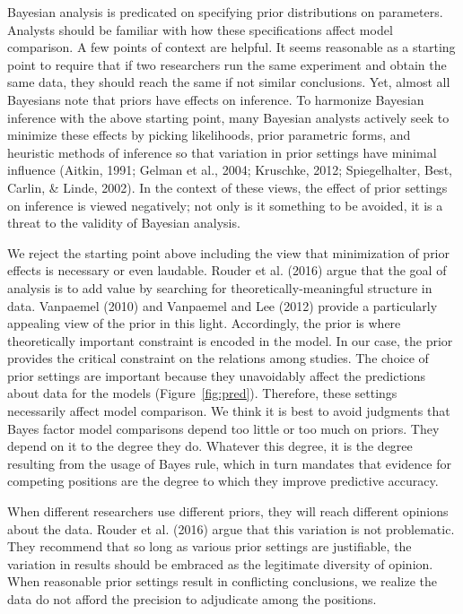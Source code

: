 \documentclass[english,man]{apa6}
\theoremstyle{definition}
\theoremstyle{definition}
\theoremstyle{definition}
\theoremstyle{remark}
\begin{document}
Bayesian analysis is predicated on specifying prior distributions on
parameters. Analysts should be familiar with how these specifications
affect model comparison. A few points of context are helpful. It seems
reasonable as a starting point to require that if two researchers run
the same experiment and obtain the same data, they should reach the same
if not similar conclusions. Yet, almost all Bayesians note that priors
have effects on inference. To harmonize Bayesian inference with the
above starting point, many Bayesian analysts actively seek to minimize
these effects by picking likelihoods, prior parametric forms, and
heuristic methods of inference so that variation in prior settings have
minimal influence (Aitkin, 1991; Gelman et al., 2004; Kruschke, 2012;
Spiegelhalter, Best, Carlin, \& Linde, 2002). In the context of these
views, the effect of prior settings on inference is viewed negatively;
not only is it something to be avoided, it is a threat to the validity
of Bayesian analysis.

We reject the starting point above including the view that minimization
of prior effects is necessary or even laudable. Rouder et al. (2016)
argue that the goal of analysis is to add value by searching for
theoretically-meaningful structure in data. Vanpaemel (2010) and
Vanpaemel and Lee (2012) provide a particularly appealing view of the
prior in this light. Accordingly, the prior is where theoretically
important constraint is encoded in the model. In our case, the prior
provides the critical constraint on the relations among studies. The
choice of prior settings are important because they unavoidably affect
the predictions about data for the models (Figure~\ref{fig:pred}).
Therefore, these settings necessarily affect model comparison. We think
it is best to avoid judgments that Bayes factor model comparisons depend
too little or too much on priors. They depend on it to the degree they
do. Whatever this degree, it is the degree resulting from the usage of
Bayes rule, which in turn mandates that evidence for competing positions
are the degree to which they improve predictive accuracy.

When different researchers use different priors, they will reach
different opinions about the data. Rouder et al. (2016) argue that this
variation is not problematic. They recommend that so long as various
prior settings are justifiable, the variation in results should be
embraced as the legitimate diversity of opinion. When reasonable prior
settings result in conflicting conclusions, we realize the data do not
afford the precision to adjudicate among the positions.
\end{document}
